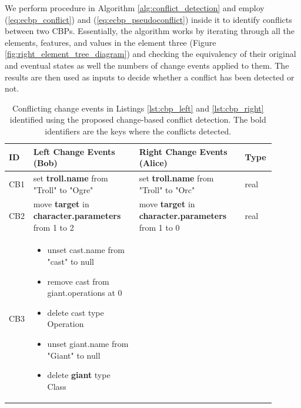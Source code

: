 We perform procedure in Algorithm \ref{alg:conflict_detection} and employ (\ref{eq:ecbp_conflict}) and (\ref{eq:ecbp_pseudoconflict}) inside it to identify conflicts between two CBPs. Essentially, the algorithm works by iterating through all the elements, features, and values in the element three (Figure \ref{fig:right_element_tree_diagram}) and checking the equivalency of their original and eventual states as well the numbers of change events applied to them. The results are then used as inputs to decide whether a conflict has been detected or not.

\begin{table}[ht]
  \centering
  \caption{Conflicting change events in Listings \ref{lst:cbp_left} and \ref{lst:cbp_right} identified using the proposed change-based conflict detection. The bold identifiers are the keys where the conflicts detected.}
  \label{table:conflicts_cbp}
    \begin{tabular}{|p{0.04\linewidth}|p{0.38\linewidth}|p{0.38\linewidth}|
        p{0.1\linewidth}|}
      \hline
      \textbf{ID} & 
      \textbf{Left Change Events (Bob)} & 
      \textbf{Right Change Events (Alice)} & 
      \textbf{Type}\\ 
      \hline
      CB1 & 
      set \textbf{troll.name} from "Troll" to "Ogre" & 
      set \textbf{troll.name} from "Troll" to "Orc" & 
      real \\
      \hline
      CB2 & move \textbf{target} in \textbf{character.parameters} from 1 to 2 & 
      move \textbf{target} in \textbf{character.parameters} from 1 to 0 & 
      real \\ 
      \hline
      CB3 & 
      \begin{minipage}[t]{\linewidth}
        \raggedright
        \begin{itemize}[leftmargin=0pt]
          \setlength
          \item[] unset cast.name from "cast" to null
          \item[] remove cast from giant.operations at 0
          \item[] delete cast type Operation
          \item[] unset giant.name from "Giant" to null
          \item[] delete \textbf{giant} type Class
        \end{itemize}
      \end{minipage}
      & 
      \begin{minipage}[t]{\linewidth}
        \raggedright
        \begin{itemize}[leftmargin=0pt]

\end{itemize}
\end{minipage}
\end{tabular}
\end{table}
